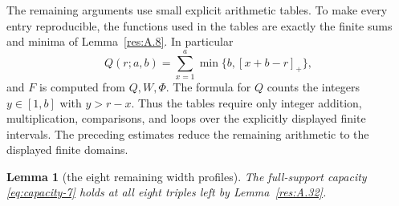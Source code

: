 \documentclass[11pt]{article}
\newtheorem{lemma}[theorem]{Lemma}
\theoremstyle{definition}
\theoremstyle{remark}
\theoremstyle{plain}
\begin{document}
The remaining arguments use small explicit arithmetic tables. To make every entry reproducible, the functions used in the tables are exactly the finite sums and minima of Lemma~\ref{res:A.8}. In particular
\[
Q(r;a,b)=\sum_{x=1}^{a}\min\{b,[x+b-r]_+\},
\]
and \(F\) is computed from \(Q,W,\Phi\). The formula for \(Q\) counts the integers \(y\in[1,b]\) with \(y>r-x\). Thus the tables require only integer addition, multiplication, comparisons, and loops over the explicitly displayed finite intervals. The preceding estimates reduce the remaining arithmetic to the displayed finite domains.

\begin{lemma}[the eight remaining width profiles]\label{res:A.33}\label{res:A.34}
The full-support capacity \eqref{eq:capacity-7} holds at all eight triples left by
Lemma~\ref{res:A.32}.
\end{lemma}
\end{document}
